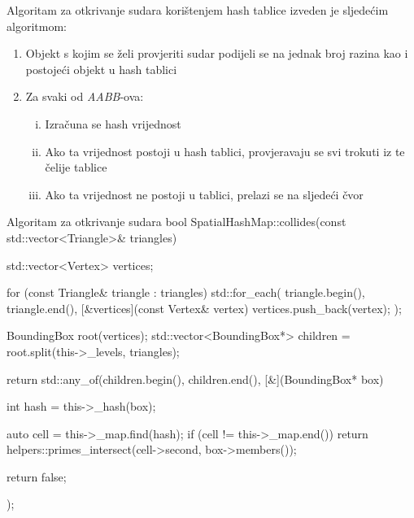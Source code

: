 Algoritam za otkrivanje sudara korištenjem hash
tablice izveden je sljedećim algoritmom:

\begin{enumerate}
    \item Objekt s kojim se želi provjeriti sudar podijeli se na jednak broj razina kao i 
          postojeći objekt u hash tablici
    \item Za svaki od \textit{AABB}-ova:
    \begin{enumerate}[i.]
        \item Izračuna se hash vrijednost
        \item Ako ta vrijednost postoji u hash tablici, provjeravaju
              se svi trokuti iz te čelije tablice
        \item Ako ta vrijednost ne postoji u tablici, prelazi se na sljedeći čvor
    \end{enumerate}
\end{enumerate}

\begin{cppSource}{Algoritam za otkrivanje sudara}
bool SpatialHashMap::collides(const std::vector<Triangle>& triangles) {
    std::vector<Vertex> vertices;

    for (const Triangle& triangle : triangles)
        std::for_each(
            triangle.begin(),
            triangle.end(),
            [&vertices](const Vertex& vertex) {
                vertices.push_back(vertex);
            }
        );

    BoundingBox root(vertices);
    std::vector<BoundingBox*> children = root.split(this->_levels, triangles);

    return std::any_of(children.begin(), children.end(), [&](BoundingBox* box) {
        int hash = this->_hash(box);

        auto cell = this->_map.find(hash);
        if (cell != this->_map.end()) {
            return helpers::primes_intersect({cell->second, box->members()});
        }

        return false;
    });
}
\end{cppSource}